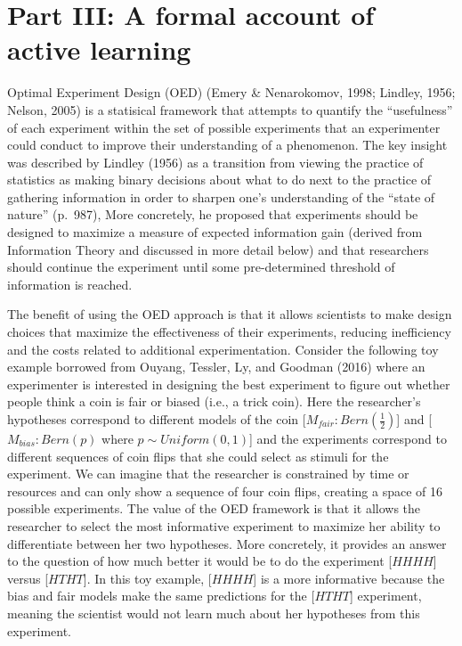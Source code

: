 \documentclass[english,floatsintext,man]{apa6}
\theoremstyle{definition}
\theoremstyle{definition}
\theoremstyle{definition}
\theoremstyle{remark}
\begin{document}
\section{Part III: A formal account of active
learning}\label{part-iii-a-formal-account-of-active-learning}

Optimal Experiment Design (OED) (Emery \& Nenarokomov, 1998; Lindley,
1956; Nelson, 2005) is a statisical framework that attempts to quantify
the \enquote{usefulness} of each experiment within the set of possible
experiments that an experimenter could conduct to improve their
understanding of a phenomenon. The key insight was described by Lindley
(1956) as a transition from viewing the practice of statistics as making
binary decisions about what to do next to the practice of gathering
information in order to sharpen one's understanding of the
\enquote{state of nature} (p.~987), More concretely, he proposed that
experiments should be designed to maximize a measure of expected
information gain (derived from Information Theory and discussed in more
detail below) and that researchers should continue the experiment until
some pre-determined threshold of information is reached.

The benefit of using the OED approach is that it allows scientists to
make design choices that maximize the effectiveness of their
experiments, reducing inefficiency and the costs related to additional
experimentation. Consider the following toy example borrowed from
Ouyang, Tessler, Ly, and Goodman (2016) where an experimenter is
interested in designing the best experiment to figure out whether people
think a coin is fair or biased (i.e., a trick coin). Here the
researcher's hypotheses correspond to different models of the coin
{[}\(M_{fair}: Bern(\frac{1}{2})\){]} and {[}\(M_{bias}: Bern(p)\) where
\(p \sim Uniform(0,1)\){]} and the experiments correspond to different
sequences of coin flips that she could select as stimuli for the
experiment. We can imagine that the researcher is constrained by time or
resources and can only show a sequence of four coin flips, creating a
space of 16 possible experiments. The value of the OED framework is that
it allows the researcher to select the most informative experiment to
maximize her ability to differentiate between her two hypotheses. More
concretely, it provides an answer to the question of how much better it
would be to do the experiment {[}\(HHHH\){]} versus {[}\(HTHT\){]}. In
this toy example, {[}\(HHHH\){]} is a more informative because the bias
and fair models make the same predictions for the {[}\(HTHT\){]}
experiment, meaning the scientist would not learn much about her
hypotheses from this experiment.
\end{document}
